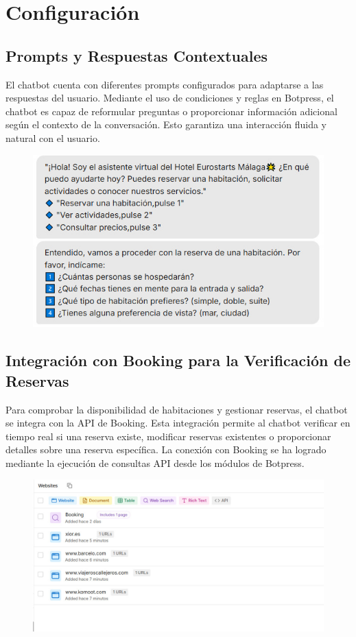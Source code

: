 \documentclass[12pt]{article}
\begin{document}
\section{Configuración}

\subsection{Prompts y Respuestas Contextuales}

El chatbot cuenta con diferentes prompts configurados para adaptarse a las respuestas del usuario. Mediante el uso de condiciones y reglas en Botpress, 
el chatbot es capaz de reformular preguntas o proporcionar información adicional según el contexto de la conversación. Esto garantiza una interacción 
fluida y natural con el usuario.

\begin{figure}[h!]
    \centering
    \includegraphics[width=.6\textwidth]{assets/Promts.jpeg}
    \label{fig:my_label}
\end{figure}

\subsection{Integración con Booking para la Verificación de Reservas}

Para comprobar la disponibilidad de habitaciones y gestionar reservas, el chatbot se integra con la API de Booking. Esta integración permite al chatbot 
verificar en tiempo real si una reserva existe, modificar reservas existentes o proporcionar detalles sobre una reserva específica. La conexión con 
Booking se ha logrado mediante la ejecución de consultas API desde los módulos de Botpress.

\begin{figure}[h!]
    \centering
    \includegraphics[width=.6\textwidth]{assets/apiBooking.jpeg}
    \label{fig:my_label}
\end{figure}
\end{document}
